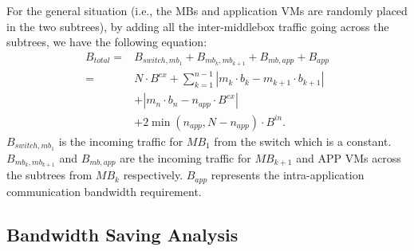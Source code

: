 \documentclass[review]{elsarticle}
\begin{document}
For the general situation (i.e., the MBs and application VMs are randomly placed in the two subtrees), by adding all the inter-middlebox traffic going across the subtrees, we have the following equation:
\begin{equation}
\begin{aligned}
B_{total}= &B_{switch,mb_{1}}+B_{mb_k,mb_{k+1}}+B_{mb,app}+B_{app}\\
 =&N\cdot B^{ex}+\sum\limits_{k=1}^{n-1}|m_k\cdot b_k-m_{k+1}\cdot b_{k+1}|\\
&+|m_n\cdot b_n-n_{app}\cdot B^{ex}|
\\&+2\min(n_{app}, N-n_{app})\cdot B^{in}.
\end{aligned}
\label{equ:bw_equation}
\end{equation}
%
$B_{switch,mb_1}$ is the incoming traffic for $MB_1$ from the switch which is a constant. $B_{mb_k,mb_{k+1}}$ and $B_{mb,app}$ are the incoming traffic for $MB_{k+1}$ and APP VMs across the subtrees from $MB_k$ respectively. $B_{app}$ represents the intra-application communication bandwidth requirement.

\subsection{Bandwidth Saving Analysis}

\end{document}
